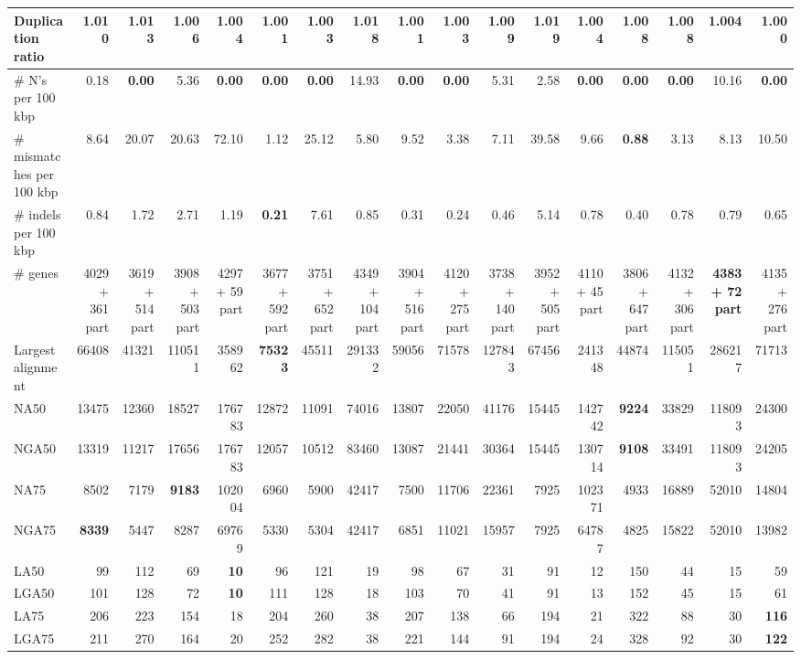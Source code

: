 \documentclass[12pt,a4paper]{article}
\begin{document}
\begin{table}[ht]
\begin{center}
\begin{tabular}{|l*{16}{|r}|}
Duplication ratio & 1.010 & 1.013 & 1.006 & 1.004 & 1.001 & 1.003 & 1.018 & 1.001 & 1.003 & 1.009 & 1.019 & 1.004 & 1.008 & 1.008 & 1.004 & {\bf 1.000} \\ \hline
\# N's per 100 kbp & 0.18 & {\bf 0.00} & 5.36 & {\bf 0.00} & {\bf 0.00} & {\bf 0.00} & 14.93 & {\bf 0.00} & {\bf 0.00} & 5.31 & 2.58 & {\bf 0.00} & {\bf 0.00} & {\bf 0.00} & 10.16 & {\bf 0.00} \\ \hline
\# mismatches per 100 kbp & 8.64 & 20.07 & 20.63 & 72.10 & 1.12 & 25.12 & 5.80 & 9.52 & 3.38 & 7.11 & 39.58 & 9.66 & {\bf 0.88} & 3.13 & 8.13 & 10.50 \\ \hline
\# indels per 100 kbp & 0.84 & 1.72 & 2.71 & 1.19 & {\bf 0.21} & 7.61 & 0.85 & 0.31 & 0.24 & 0.46 & 5.14 & 0.78 & 0.40 & 0.78 & 0.79 & 0.65 \\ \hline
\# genes & 4029 + 361 part & 3619 + 514 part & 3908 + 503 part & 4297 + 59 part & 3677 + 592 part & 3751 + 652 part & 4349 + 104 part & 3904 + 516 part & 4120 + 275 part & 3738 + 140 part & 3952 + 505 part & 4110 + 45 part & 3806 + 647 part & 4132 + 306 part & {\bf 4383 + 72 part} & 4135 + 276 part \\ \hline
Largest alignment & 66408 & 41321 & 110511 & 358962 & {\bf 75323} & 45511 & 291332 & 59056 & 71578 & 127843 & 67456 & 241348 & 44874 & 115051 & 286217 & 71713 \\ \hline
NA50 & 13475 & 12360 & 18527 & 176783 & 12872 & 11091 & 74016 & 13807 & 22050 & 41176 & 15445 & 142742 & {\bf 9224} & 33829 & 118093 & 24300 \\ \hline
NGA50 & 13319 & 11217 & 17656 & 176783 & 12057 & 10512 & 83460 & 13087 & 21441 & 30364 & 15445 & 130714 & {\bf 9108} & 33491 & 118093 & 24205 \\ \hline
NA75 & 8502 & 7179 & {\bf 9183} & 102004 & 6960 & 5900 & 42417 & 7500 & 11706 & 22361 & 7925 & 102371 & 4933 & 16889 & 52010 & 14804 \\ \hline
NGA75 & {\bf 8339} & 5447 & 8287 & 69769 & 5330 & 5304 & 42417 & 6851 & 11021 & 15957 & 7925 & 64787 & 4825 & 15822 & 52010 & 13982 \\ \hline
LA50 & 99 & 112 & 69 & {\bf 10} & 96 & 121 & 19 & 98 & 67 & 31 & 91 & 12 & 150 & 44 & 15 & 59 \\ \hline
LGA50 & 101 & 128 & 72 & {\bf 10} & 111 & 128 & 18 & 103 & 70 & 41 & 91 & 13 & 152 & 45 & 15 & 61 \\ \hline
LA75 & 206 & 223 & 154 & 18 & 204 & 260 & 38 & 207 & 138 & 66 & 194 & 21 & 322 & 88 & 30 & {\bf 116} \\ \hline
LGA75 & 211 & 270 & 164 & 20 & 252 & 282 & 38 & 221 & 144 & 91 & 194 & 24 & 328 & 92 & 30 & {\bf 122} \\ \hline
\end{tabular}
\end{center}
\end{table}
\end{document}
